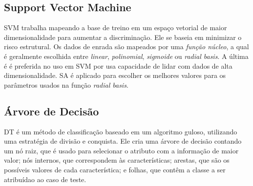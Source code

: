 \subsection{Support Vector Machine}
SVM trabalha mapeando a base de treino em um espaço vetorial de maior dimensionalidade para aumentar a discriminação.
Ele se baseia em minimizar o risco estrutural. Os dados de enrada são mapeados por uma \textit{função núcleo}, a qual
é geralmente escolhida entre \textit{linear}, \textit{polinomial}, \textit{sigmoide} ou \textit{radial basis}. A última é
é preferida no uso em SVM por usa capacidade de lidar com dados de alta dimensionalidade. SA é aplicado para escolher
os melhores valores para os parâmetros usados na função \textit{radial basis}.

\subsection{Árvore de Decisão}
DT é um método de classificação baseado em um algoritmo guloso, utilizando uma estratégia de divisão e conquista. Ele
cria uma árvore de decisão contando um nó raiz, que é usado para selecionar o atributo com a informação de maior valor;
nós internos, que correspondem às características; arestas, que são os possíveis valores de cada característica; e
folhas, que contêm a classe a ser atribuídao ao caso de teste.


